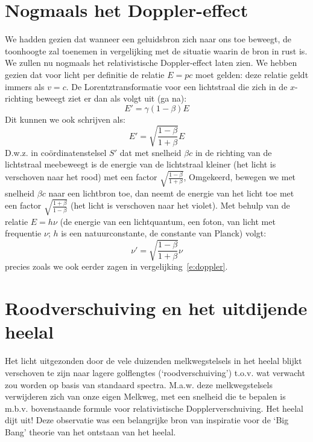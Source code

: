 \section{Nogmaals het Doppler-effect}
We hadden gezien dat wanneer een geluidsbron zich naar ons toe beweegt, de toonhoogte zal toenemen
in vergelijking met de situatie waarin de bron in rust is.
We zullen nu nogmaals het relativistische Doppler-effect laten zien.
We hebben gezien dat voor licht per definitie de relatie $E = pc$ moet
gelden: deze relatie geldt immers als $v = c$.
De Lorentztransformatie voor een lichtstraal die zich in de $x$-richting
beweegt
ziet er dan als volgt uit (ga na):
\begin{displaymath}
E' = \gamma (1 - \beta) E
\end{displaymath}
Dit kunnen we ook schrijven als:
\begin{displaymath}
E' = \sqrt{\frac{1 - \beta}{1 + \beta}}E
\end{displaymath}
D.w.z. in co\"{o}rdinatenstelsel $S'$ dat met 
snelheid $\beta c$ in de richting van de lichtstraal
meebeweegt is de energie van de lichtstraal kleiner (het licht is verschoven
naar het rood) met een factor
$\sqrt{\frac{1 - \beta}{1 + \beta}}$,
Omgekeerd, bewegen we met snelheid $\beta c$ naar een lichtbron toe, dan
neemt de energie van het
licht toe met een factor $\sqrt{\frac{1 + \beta}{1 - \beta}}$
(het licht is verschoven naar het violet).
Met behulp van de relatie $E = h \nu$ (de energie van een lichtquantum, een
foton, van licht met frequentie $\nu$; $h$ is een natuurconstante, de
constante van Planck) volgt:
\begin{displaymath}
\nu' =  \sqrt{\frac{1 - \beta}{1 + \beta}}\nu
\end{displaymath}
precies zoals we ook eerder zagen in vergelijking~\ref{e:doppler}.

\section{Roodverschuiving en het uitdijende heelal}
Het licht uitgezonden door de vele duizenden melkwegstelsels in het heelal
blijkt verschoven te zijn naar lagere golflengtes (`roodverschuiving') t.o.v.
wat verwacht zou worden op basis van standaard spectra.
M.a.w. deze melkwegstelsels verwijderen zich van onze eigen Melkweg, met een
snelheid die te bepalen is m.b.v. bovenstaande formule voor relativistische
Dopplerverschuiving.
Het heelal dijt uit!
Deze observatie was een belangrijke bron van inspiratie voor de `Big Bang'
theorie van het ontstaan van het heelal.

